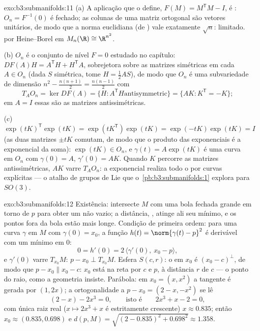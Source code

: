 \begin{solution}{exo:b3:submanifolds:11}
(a) A aplicação que o define, $F(M) = M^{\mathsf T}M - I$, é
: $O_n = F^{-1}(0)$ é fechado; as colunas de uma matriz
ortogonal são vetores unitários, de modo que a norma euclidiana
(de ) vale exatamente $\sqrt n$: limitado.  por
Heine--Borel em $M_n(\R) \cong \R^{n^2}$.

(b) $O_n$ é o conjunto de nível $F = 0$ estudado no capítulo:
$DF(A)H = A^{\mathsf T}H + H^{\mathsf T}A$, sobrejetora sobre as
matrizes simétricas em cada $A \in O_n$ (dada $S$ simétrica,
tome $H = \frac12AS$), de modo que $O_n$ é uma subvariedade de
dimensão $n^2 - \frac{n(n+1)}2 = \frac{n(n-1)}2$ com
\[
T_AO_n = \ker DF(A) = \{H : A^{\mathsf T}H \text{
antisymmetric}\} = \{AK : K^{\mathsf T} = -K\} ;
\]
em $A = I$ essas são as matrizes antissimétricas.

(c) $\exp(tK)^{\mathsf T}\exp(tK) = \exp(tK^{\mathsf T})
\exp(tK) = \exp(-tK)\exp(tK) = I$ (as duas matrizes $\pm tK$
comutam, de modo que o produto das exponenciais é a exponencial
da soma): $\exp(tK) \in O_n$, e $\gamma(t) =
A\exp(tK)$ é uma curva em $O_n$ com $\gamma(0) = A$,
$\gamma'(0) = AK$. Quando $K$ percorre as matrizes antissimétricas,
$AK$ varre $T_AO_n$: a exponencial realiza todo o
 por curvas explícitas --- o atalho de grupos de Lie
que o~\cref{pb:b3:submanifolds:1} explora para $SO(3)$.
\end{solution}

\begin{solution}{exo:b3:submanifolds:12}
Existência: intersecte $M$ com uma bola fechada grande em torno de
$p$ para obter um  não vazio; a distância, ,
atinge ali seu mínimo, e os pontos fora da bola estão
mais longe. Condição de primeira ordem: para uma curva $\gamma$ em $M$
com $\gamma(0) = x_0$, a função $h(t) = \norm{\gamma(t)
- p}^2$ é derivável com um mínimo em $0$:
\[
0 = h'(0) = 2\,\langle\gamma'(0),\ x_0 - p\rangle,
\]
e $\gamma'(0)$ varre $T_{x_0}M$: $p - x_0 \perp
T_{x_0}M$. Esfera $S(c, r)$: o  em $x_0$ é
$(x_0 - c)^\perp$, de modo que $p - x_0 \parallel x_0 - c$: $x_0$
está na reta por $c$ e $p$, à distância $r$ de
$c$ --- o ponto do raio, como a geometria insiste. Parábola: em
$x_0 = (x, x^2)$ a tangente é gerada por $(1, 2x)$;
a ortogonalidade a $p - x_0 = (2 - x, -x^2)$ se lê
\[
(2 - x) - 2x^3 = 0,
\qquad\text{isto é}\qquad 2x^3 + x - 2 = 0,
\]
com única raiz real ($x \mapsto 2x^3 + x$ é estritamente
crescente) $x \approx 0.835$; então $x_0 \approx (0.835,
0.698)$ e $d(p, M) = \sqrt{(2 - 0.835)^2 + 0.698^2}
\approx 1.358$.
\end{solution}

